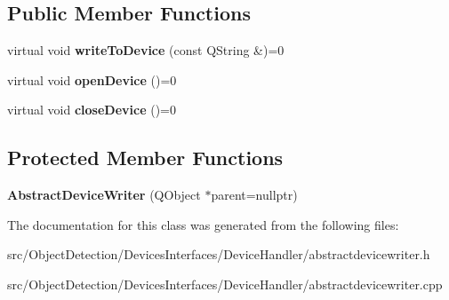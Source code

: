 \subsection*{Public Member Functions}
\begin{DoxyCompactItemize}
\item 
\mbox{\label{class_devices_1_1_abstract_device_writer_a5fad14b09f0fed1f225e45efa7f19122}} 
virtual void {\bfseries write\+To\+Device} (const Q\+String \&)=0
\item 
\mbox{\label{class_devices_1_1_abstract_device_writer_ab0b97c22bd53240a29e997b7e665956d}} 
virtual void {\bfseries open\+Device} ()=0
\item 
\mbox{\label{class_devices_1_1_abstract_device_writer_a04ef6838866f61e59eb56bfff11b3da6}} 
virtual void {\bfseries close\+Device} ()=0
\end{DoxyCompactItemize}
\subsection*{Protected Member Functions}
\begin{DoxyCompactItemize}
\item 
\mbox{\label{class_devices_1_1_abstract_device_writer_a25679076ac5f57cbc317a8c07c1ebf25}} 
{\bfseries Abstract\+Device\+Writer} (Q\+Object $\ast$parent=nullptr)
\end{DoxyCompactItemize}


The documentation for this class was generated from the following files\+:\begin{DoxyCompactItemize}
\item 
src/\+Object\+Detection/\+Devices\+Interfaces/\+Device\+Handler/abstractdevicewriter.\+h\item 
src/\+Object\+Detection/\+Devices\+Interfaces/\+Device\+Handler/abstractdevicewriter.\+cpp\end{DoxyCompactItemize}
